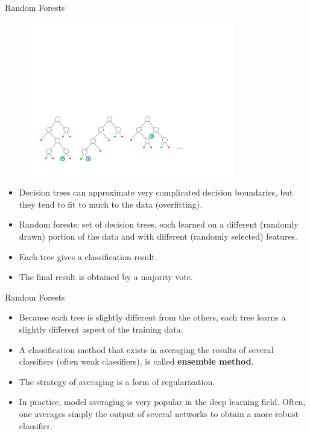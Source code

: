 \documentclass[xcolor=pdftex,dvipsnames,table]{beamer}
\begin{document}
\begin{frame}{Random Forests}
\begin{figure}[htb]
\includegraphics[width=0.8\textwidth]{../graphics/Forest.pdf}
\end{figure}
\begin{itemize}
	\item Decision trees can approximate very complicated decision boundaries, but they tend to fit to much to the data (overfitting).
	\item Random forests: set of decision trees, each learned on a different (randomly drawn) portion of the data and with different (randomly selected) features.
	\item Each tree gives a classification result.
	\item The final result is obtained by a majority vote.
\end{itemize}
\end{frame}

\begin{frame}{Random Forests}
\begin{itemize}
	\item Because each tree is slightly different from the others, each tree learns a slightly different aspect of the training data.
	\item A classification method that exists in averaging the results of several classifiers (often weak classifiers), is called {\bf ensemble method}.
	\item The strategy of averaging is a form of regularization.
	\item In practice, model averaging is very popular in the deep learning field. Often, one averages simply the output of several networks to obtain a more robust classifier.
\end{itemize}
\end{frame}
\end{document}

